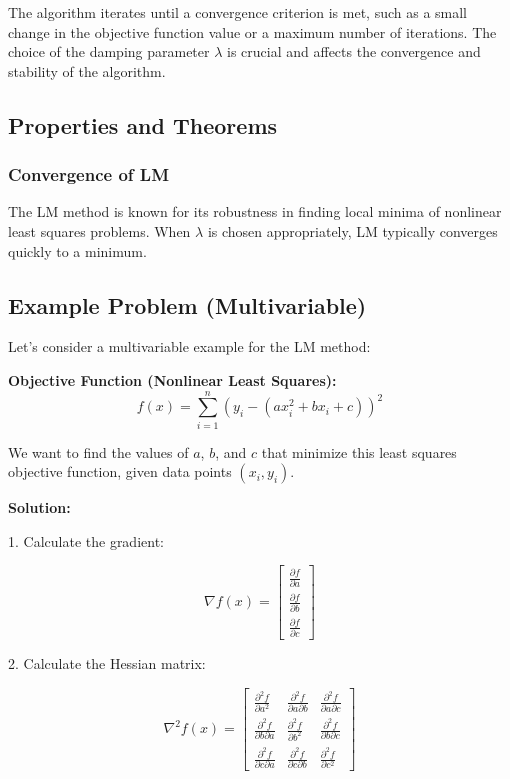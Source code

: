 \documentclass[a4paper]{article}
\begin{document}
The algorithm iterates until a convergence criterion is met, such as a small change in the objective function value or a maximum number of iterations. The choice of the damping parameter $\lambda$ is crucial and affects the convergence and stability of the algorithm.

\subsection{Properties and Theorems}

\subsubsection{Convergence of LM}

The LM method is known for its robustness in finding local minima of nonlinear least squares problems. When $\lambda$ is chosen appropriately, LM typically converges quickly to a minimum.

\subsection{Example Problem (Multivariable)}

Let's consider a multivariable example for the LM method:

\textbf{Objective Function (Nonlinear Least Squares):} 
\[
f(x) = \sum_{i=1}^{n} (y_i - (ax_i^2 + bx_i + c))^2
\]

We want to find the values of $a$, $b$, and $c$ that minimize this least squares objective function, given data points $(x_i, y_i)$.

\textbf{Solution:}

1. Calculate the gradient:

\[
\nabla f(x) = \begin{bmatrix}
\frac{\partial f}{\partial a} \\
\frac{\partial f}{\partial b} \\
\frac{\partial f}{\partial c}
\end{bmatrix}
\]

2. Calculate the Hessian matrix:

\[
\nabla^2 f(x) = \begin{bmatrix}
\frac{\partial^2 f}{\partial a^2} & \frac{\partial^2 f}{\partial a \partial b} & \frac{\partial^2 f}{\partial a \partial c} \\
\frac{\partial^2 f}{\partial b \partial a} & \frac{\partial^2 f}{\partial b^2} & \frac{\partial^2 f}{\partial b \partial c} \\
\frac{\partial^2 f}{\partial c \partial a} & \frac{\partial^2 f}{\partial c \partial b} & \frac{\partial^2 f}{\partial c^2}
\end{bmatrix}
\]
\end{document}
